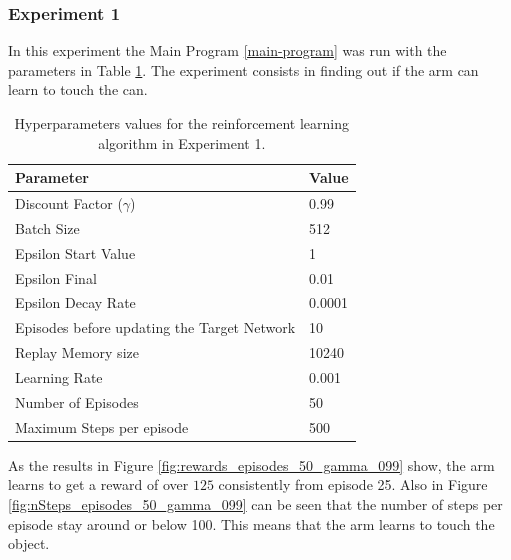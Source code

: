 \documentclass[12pt,oneside]{article}
\begin{document}
\subsubsection{Experiment 1}
In this experiment the Main Program \ref{main-program} was run with the parameters in Table \ref{tab:hyperparams-exp-1}. The experiment consists in finding out if the arm can learn to touch the can.
\begin{table}[h]
\centering
\begin{tabular}{l l}
\hline
Parameter & Value \\
\hline
Discount Factor ($\gamma$) & 0.99 \\
Batch Size & 512 \\
Epsilon Start Value & 1 \\
Epsilon Final & 0.01 \\
Epsilon Decay Rate & 0.0001 \\
Episodes before updating the Target Network & 10 \\
Replay Memory size & 10240 \\
Learning Rate & 0.001 \\
Number of Episodes & 50 \\
Maximum Steps per episode & 500 \\
\hline
\end{tabular}
\caption{Hyperparameters values for the reinforcement learning algorithm in Experiment 1.}
\label{tab:hyperparams-exp-1}
\end{table}

As the results in Figure \ref{fig:rewards_episodes_50_gamma_099} show, the arm learns to get a reward of over $125$ consistently from episode 25. Also in Figure \ref{fig:nSteps_episodes_50_gamma_099} can be seen that the number of steps per episode stay around or below 100. This means that the arm learns to touch the object.
\end{document}
